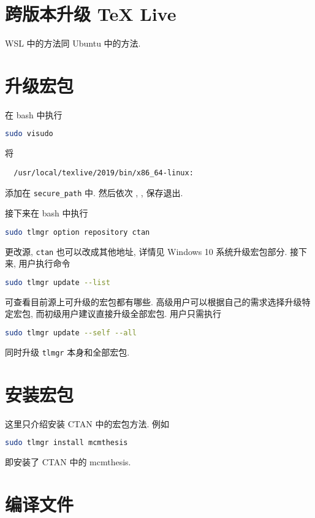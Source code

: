 \section{跨版本升级 \TeX{} Live}
WSL 中的方法同 Ubuntu 中的方法.

\section{升级宏包}

在 \textsf{bash} 中执行
\begin{lstlisting}[language = bash]
  sudo visudo
\end{lstlisting}
将
\begin{lstlisting}
  /usr/local/texlive/2019/bin/x86_64-linux:
\end{lstlisting}
添加在 \texttt{secure\_path} 中.
然后依次 , , \keys{\enter} 保存退出.

接下来在 \textsf{bash} 中执行
\begin{lstlisting}[language = bash]
  sudo tlmgr option repository ctan
\end{lstlisting}
更改源, \texttt{ctan} 也可以改成其他地址, 详情见 Windows 10 系统升级宏包部分.
接下来, 用户执行命令
\begin{lstlisting}[language = bash]
  sudo tlmgr update --list
\end{lstlisting}
可查看目前源上可升级的宏包都有哪些. 
高级用户可以根据自己的需求选择升级特定宏包, 而初级用户建议直接升级全部宏包. 
用户只需执行
\begin{lstlisting}[language = bash]
  sudo tlmgr update --self --all
\end{lstlisting}
同时升级 \texttt{tlmgr} 本身和全部宏包. 

\section{安装宏包}

这里只介绍安装 CTAN 中的宏包方法.
例如
\begin{lstlisting}[language = bash]
  sudo tlmgr install mcmthesis
\end{lstlisting}
即安装了 CTAN 中的 mcmthesis.

\section{编译文件}

